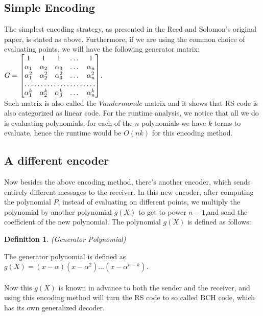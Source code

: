 \documentclass{article}
\newtheorem{Definition}{Definition}
\begin{document}
\subsection{Simple Encoding}
The simplest encoding strategy, as presented in the Reed and Solomon's original paper, is stated as above. Furthermore, if we are using the common choice of evaluating points, we will have the following generator matrix:\\
$G = \begin{bmatrix}
	1 & 1 & 1 &\dots & 1 \\
	\alpha_1 & \alpha_2 & \alpha_3 & \dots & \alpha_n \\
	\alpha_1^2 & \alpha_2^2 & \alpha_3^2 & \dots & \alpha_n^2  \\
	\hdotsfor{5} \\
	\alpha_1^k & \alpha_2^k & \alpha_3^k & \dots & \alpha_n^k \\
    \end{bmatrix}$.\\
Such matrix is also called the $Vandermonde$ matrix and it shows that RS code is also categorized as linear code. For the runtime analysis, we notice that all we do is evaluating polynomials, for each of the $n$ polynomials we have $k$ terms to evaluate, hence the runtime would be $O(nk)$ for this encoding method.
\subsection{A different encoder}
Now besides the above encoding method, there's another encoder, which sends entirely different messages to the receiver. In this new encoder, after computing the polynomial $P$, instead of evaluating on different points, we multiply the polynomial by another polynomial $g(X)$ to get to power $n-1$,and send the coefficient of the new polynomial. The polynomial $g(X)$ is defined as follows:
\begin{Definition}(Generator Polynomial)\end{Definition}
\noindent The generator polynomial is defined as $g(X) = (x-\alpha)(x-\alpha^2)...(x-\alpha^{n-k})$.\\\\
Now this $g(X)$ is known in advance to both the sender and the receiver, and using this encoding method will turn the RS code to so called BCH code, which has its own generalized decoder.
\end{document}
